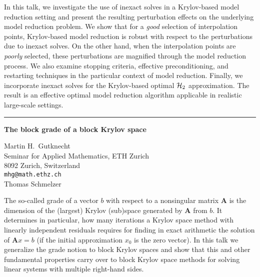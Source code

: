 \documentclass[twosided]{report}
\newcommand{\bfA}{{\mathbf A}}
\begin{document}
In this talk, we investigate the use of
inexact solves in a Krylov-based model reduction setting and
present the resulting perturbation effects on the underlying
model reduction problem. We show that for a \emph{good}
selection of interpolation points, Krylov-based model
reduction is robust with respect to the perturbations due to
inexact solves. On the other hand, when the interpolation
points are \emph{poorly} selected, these perturbations are
magnified through the model reduction process. We also
examine stopping criteria, effective preconditioning, and
restarting techniques in the particular context of model
reduction. Finally, we incorporate inexact solves for the
Krylov-based optimal ${\cal H}_2$ approximation. The result
is an effective optimal model reduction algorithm applicable
in realistic large-scale settings.



	\begin{center} \rule{6in}{1pt} \end{center}

\begin{center}
{\large			%
{\bf The block grade of a block Krylov space}}

	Martin H.~Gutknecht \\
	Seminar for Applied Mathematics, ETH Zurich \\
	8092 Zurich, Switzerland \\
	{\tt mhg@math.ethz.ch} \\
	Thomas Schmelzer
\end{center}
The so-called grade of a
vector $b$ with respect to a nonsingular matrix $\bfA$ is
the dimension of the (largest) Krylov (sub)space generated
by $\bfA$ from $b$. It determines in particular, how many
iterations a Krylov space method with linearly independent
residuals requires for finding in exact arithmetic the
solution of $\bfA x=b$ (if the initial approximation $x_0$
is the zero vector). In this talk we generalize the grade
notion to block Krylov spaces and show that this and other
fundamental properties carry over to block Krylov space
methods for solving linear systems with multiple right-hand
sides.
\end{document}
